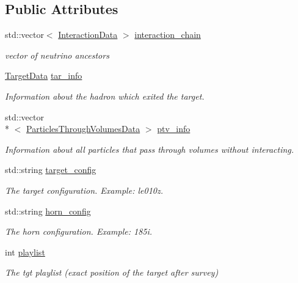 \subsection*{Public Attributes}
\begin{DoxyCompactItemize}
\item 
std\-::vector$<$ \hyperlink{class_neutrino_flux_reweight_1_1_interaction_data}{Interaction\-Data} $>$ \hyperlink{class_neutrino_flux_reweight_1_1_interaction_chain_data_a5864063b9c20b4f70e4f1e355df21963}{interaction\-\_\-chain}
\begin{DoxyCompactList}\small\item\em vector of neutrino ancestors \end{DoxyCompactList}\item 
\hyperlink{class_neutrino_flux_reweight_1_1_target_data}{Target\-Data} \hyperlink{class_neutrino_flux_reweight_1_1_interaction_chain_data_a6df89bff97001a4988487fcfb9f4acea}{tar\-\_\-info}
\begin{DoxyCompactList}\small\item\em Information about the hadron which exited the target. \end{DoxyCompactList}\item 
std\-::vector\\*
$<$ \hyperlink{class_neutrino_flux_reweight_1_1_particles_through_volumes_data}{Particles\-Through\-Volumes\-Data} $>$ \hyperlink{class_neutrino_flux_reweight_1_1_interaction_chain_data_adda6bc8863579964b62e3d4f51e14926}{ptv\-\_\-info}
\begin{DoxyCompactList}\small\item\em Information about all particles that pass through volumes without interacting. \end{DoxyCompactList}\item 
std\-::string \hyperlink{class_neutrino_flux_reweight_1_1_interaction_chain_data_a8362a0f94df2bd321e0b60a38c41fb7a}{target\-\_\-config}
\begin{DoxyCompactList}\small\item\em The target configuration. Example\-: le010z. \end{DoxyCompactList}\item 
std\-::string \hyperlink{class_neutrino_flux_reweight_1_1_interaction_chain_data_a343d6a28ec2d41252a6067833b75f831}{horn\-\_\-config}
\begin{DoxyCompactList}\small\item\em The horn configuration. Example\-: 185i. \end{DoxyCompactList}\item 
int \hyperlink{class_neutrino_flux_reweight_1_1_interaction_chain_data_aca185ce4c11a46ea16b29a55ff97a490}{playlist}
\begin{DoxyCompactList}\small\item\em The tgt playlist (exact position of the target after survey) \end{DoxyCompactList}\end{DoxyCompactItemize}
